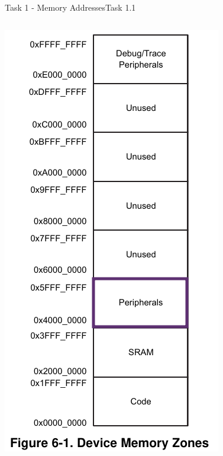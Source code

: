 \begin{frame}{Task 1 - Memory Addresses}{Task 1.1}
  \begin{solution}
    \begin{columns}
      \begin{column}{0.4\textwidth}
        \includegraphics[height=0.5\paperheight]{./figures/peripherals.png}

\end{column}
\end{columns}
\end{solution}
\end{frame}
